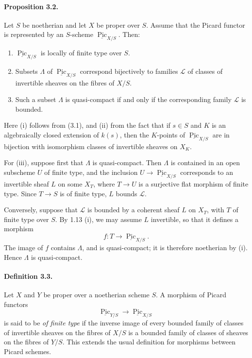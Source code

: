 \documentclass[12pt]{article}
\newcommand{\cL}{\mathcal L}
\newcommand{\Pic}{\operatorname{Pic}}
\newcommand{\longto}{\longrightarrow}
\begin{document}
\paragraph{Proposition 3.2.}
Let $S$ be noetherian and let $X$ be proper over $S$. Assume that the Picard functor is represented by an $S$-scheme $\underline{\Pic}_{X/S}$. Then:
\begin{enumerate}[label=\roman*)]
\item $\underline{\Pic}_{X/S}$ is locally of finite type over $S$.
\item Subsets $\Lambda$ of $\underline{\Pic}_{X/S}$ correspond bijectively to families $\cL$ of classes of invertible sheaves on the fibres of $X/S$.
\item Such a subset $\Lambda$ is quasi-compact if and only if the corresponding family $\cL$ is bounded.
\end{enumerate}

Here (i) follows from (3.1), and (ii) from the fact that if $s\in S$ and $K$ is an algebraically closed extension of $k(s)$, then the $K$-points of $\underline{\Pic}_{X/S}$ are in bijection with isomorphism classes of invertible sheaves on $X_K$.

For (iii), suppose first that $\Lambda$ is quasi-compact. Then $\Lambda$ is contained in an open subscheme $U$ of finite type, and the inclusion $U\to \underline{\Pic}_{X/S}$ corresponds to an invertible sheaf $L$ on some $X_T$, where $T\to U$ is a surjective flat morphism of finite type. Since $T\to S$ is of finite type, $L$ bounds $\cL$.

Conversely, suppose that $\cL$ is bounded by a coherent sheaf $L$ on $X_T$, with $T$ of finite type over $S$. By 1.13 (i), we may assume $L$ invertible, so that it defines a morphism
\[
f:T\longto \underline{\Pic}_{X/S}.
\]
The image of $f$ contains $\Lambda$, and is quasi-compact; it is therefore noetherian by (i). Hence $\Lambda$ is quasi-compact.

\paragraph{Definition 3.3.}
Let $X$ and $Y$ be proper over a noetherian scheme $S$. A morphism of Picard functors
\[
\underline{\Pic}_{Y/S}\longto \underline{\Pic}_{X/S}
\]
is said to be \emph{of finite type} if the inverse image of every bounded family of classes of invertible sheaves on the fibres of $X/S$ is a bounded family of classes of sheaves on the fibres of $Y/S$. This extends the usual definition for morphisms between Picard schemes.
\end{document}
